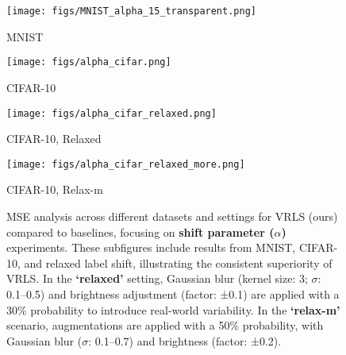 \begin{figure}[!t]
    \centering
    \begin{minipage}{.24\textwidth}
        \centering
        \texttt{[image: figs/MNIST\_alpha\_15\_transparent.png]}
        \caption*{MNIST} 
        \label{fig:MNIST_alpha_15_transparent}
    \end{minipage}%
    \begin{minipage}{.24\textwidth}
        \centering
        \texttt{[image: figs/alpha\_cifar.png]}
        \caption*{CIFAR-10}
        \label{fig:alpha_cifar}
    \end{minipage}%
    \begin{minipage}{.24\textwidth}
        \centering
        \texttt{[image: figs/alpha\_cifar\_relaxed.png]}
        \caption*{CIFAR-10, Relaxed}
        \label{fig:alpha_cifar_relaxed}
    \end{minipage}%
    \begin{minipage}{.24\textwidth}
        \centering
        \texttt{[image: figs/alpha\_cifar\_relaxed\_more.png]}
        \caption*{CIFAR-10, Relax-m}
        \label{fig:alpha_cifar_relaxed_more}
    \end{minipage}
    \vspace{-0.5em}
    \caption{MSE analysis across different datasets and settings for VRLS (ours) compared to baselines, focusing on \textbf{shift parameter ($\alpha$)} experiments. These subfigures include results from MNIST, CIFAR-10, and relaxed label shift, illustrating the consistent superiority of VRLS. In the \textbf{‘relaxed’} setting, Gaussian blur (kernel size: 3; $\sigma$: 0.1–0.5) and brightness adjustment (factor: ±0.1) are applied with a 30\% probability to introduce real-world variability. In the \textbf{‘relax-m’} scenario, augmentations are applied with a 50\% probability, with Gaussian blur ($\sigma$: 0.1–0.7) and brightness (factor: ±0.2).}
    \label{figure_shift}
\end{figure}


